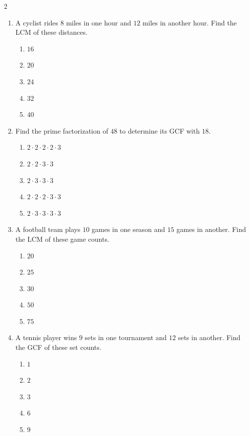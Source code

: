 \documentclass[10pt]{article}
\begin{document}
\begin{multicols}{2}
\begin{enumerate}[label=\textbf{Q\arabic*.}, leftmargin=*, itemsep=6pt, parsep=0pt]
  \item \small A cyclist rides $8$ miles in one hour and $12$ miles in another hour. Find the LCM of these distances.
  \begin{enumerate}[label=(\Alph*), leftmargin=0.6cm, nosep, itemsep=2pt]
    \item $16$
    \item $20$
    \item $24$
    \item $32$
    \item $40$
  \end{enumerate}

  \item \small Find the prime factorization of $48$ to determine its GCF with $18$.
  \begin{enumerate}[label=(\Alph*), leftmargin=0.6cm, nosep, itemsep=2pt]
    \item $2 \cdot 2 \cdot 2 \cdot 2 \cdot 3$
    \item $2 \cdot 2 \cdot 3 \cdot 3$
    \item $2 \cdot 3 \cdot 3 \cdot 3$
    \item $2 \cdot 2 \cdot 2 \cdot 3 \cdot 3$
    \item $2 \cdot 3 \cdot 3 \cdot 3 \cdot 3$
  \end{enumerate}

  \item \small A football team plays $10$ games in one season and $15$ games in another. Find the LCM of these game counts.
  \begin{enumerate}[label=(\Alph*), leftmargin=0.6cm, nosep, itemsep=2pt]
    \item $20$
    \item $25$
    \item $30$
    \item $50$
    \item $75$
  \end{enumerate}

  \item \small A tennis player wins $9$ sets in one tournament and $12$ sets in another. Find the GCF of these set counts.
  \begin{enumerate}[label=(\Alph*), leftmargin=0.6cm, nosep, itemsep=2pt]
    \item $1$
    \item $2$
    \item $3$
    \item $6$
    \item $9$
  \end{enumerate}


\end{enumerate}
\end{multicols}
\end{document}

